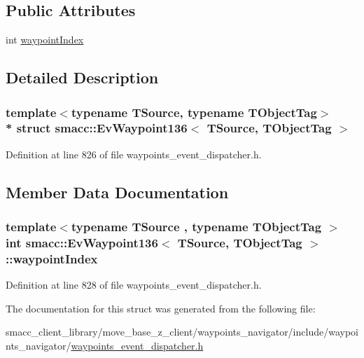 \subsection*{Public Attributes}
\begin{DoxyCompactItemize}
\item 
int \hyperlink{structsmacc_1_1EvWaypoint136_ad8ce4ad77e0a1e0f6a9001c6c2323d4f}{waypoint\+Index}
\end{DoxyCompactItemize}


\subsection{Detailed Description}
\subsubsection*{template$<$typename T\+Source, typename T\+Object\+Tag$>$\\*
struct smacc\+::\+Ev\+Waypoint136$<$ T\+Source, T\+Object\+Tag $>$}



Definition at line 826 of file waypoints\+\_\+event\+\_\+dispatcher.\+h.



\subsection{Member Data Documentation}
\subsubsection[{\texorpdfstring{waypoint\+Index}{waypointIndex}}]{\setlength{\rightskip}{0pt plus 5cm}template$<$typename T\+Source , typename T\+Object\+Tag $>$ int {\bf smacc\+::\+Ev\+Waypoint136}$<$ T\+Source, T\+Object\+Tag $>$\+::waypoint\+Index}\hypertarget{structsmacc_1_1EvWaypoint136_ad8ce4ad77e0a1e0f6a9001c6c2323d4f}{}\label{structsmacc_1_1EvWaypoint136_ad8ce4ad77e0a1e0f6a9001c6c2323d4f}


Definition at line 828 of file waypoints\+\_\+event\+\_\+dispatcher.\+h.



The documentation for this struct was generated from the following file\+:\begin{DoxyCompactItemize}
\item 
smacc\+\_\+client\+\_\+library/move\+\_\+base\+\_\+z\+\_\+client/waypoints\+\_\+navigator/include/waypoints\+\_\+navigator/\hyperlink{waypoints__event__dispatcher_8h}{waypoints\+\_\+event\+\_\+dispatcher.\+h}\end{DoxyCompactItemize}

